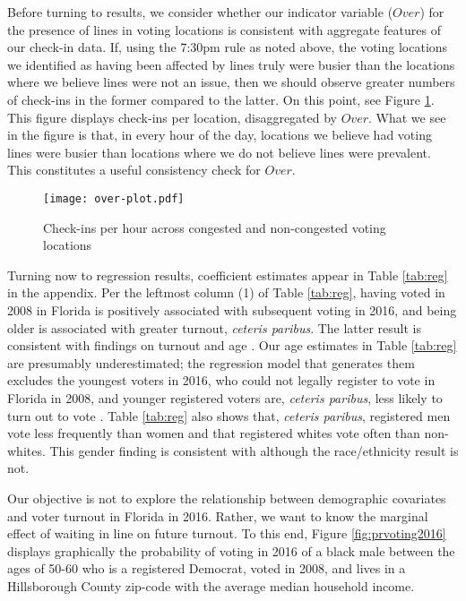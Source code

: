 \documentclass[12pt,titlepage]{article}
\begin{document}
Before turning to results, we consider whether our indicator variable
($Over$) for the presence of lines in voting locations is consistent
with aggregate features of our check-in data. If, using the 7:30pm
rule as noted above, the voting locations we identified as having been
affected by lines truly were busier than the locations where we
believe lines were not an issue, then we should observe greater
numbers of check-ins in the former compared to the latter. On this
point, see Figure \ref{fig:overplot}. This figure displays check-ins
per location, disaggregated by $Over$. What we see in the figure is
that, in every hour of the day, locations we believe had voting lines
were busier than locations where we do not believe lines were
prevalent. This constitutes a useful consistency check for $Over$.

\begin{figure}[!ht]
  \caption{Check-ins per hour across congested and non-congested
    voting locations}
  \label{fig:overplot}
  \centering
    \centering\texttt{[image: over-plot.pdf]}
\end{figure}

Turning now to regression results, coefficient estimates appear in
Table \ref{tab:reg} in the appendix. Per the leftmost column (1) of
Table \ref{tab:reg}, having voted in 2008 in Florida is positively
associated with subsequent voting in 2016, and being older is
associated with greater turnout, \emph{ceteris paribus}. The latter
result is consistent with findings on turnout and age
\citep{costaetal:walkingthewalk}. Our age estimates in Table
\ref{tab:reg} are presumably underestimated; the regression model that
generates them excludes the youngest voters in 2016, who could not
legally register to vote in Florida in 2008, and younger registered
voters are, \emph{ceteris paribus}, less likely to turn out to vote
\citep{shinosmith:registrationtiming}. Table \ref{tab:reg} also shows
that, \emph{ceteris paribus}, registered men vote less frequently than
women and that registered whites vote often than non-whites. This
gender finding is consistent with \citet{leighleynagler:whovotesnow}
although the race/ethnicity result is not.

Our objective is not to explore the relationship between demographic
covariates and voter turnout in Florida in 2016.  Rather, we want to
know the marginal effect of waiting in line on future turnout.  To
this end, Figure \ref{fig:prvoting2016} displays graphically the
probability of voting in 2016 of a black male between the ages of
50-60 who is a registered Democrat, voted in 2008, and lives in a
Hillsborough County zip-code with the average median household income.
\end{document}
